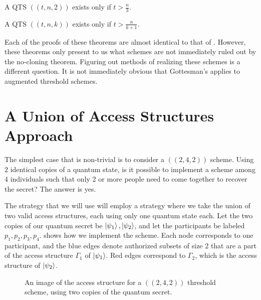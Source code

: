 \begin{theorem}
	\label{thm:qts2}
	A QTS $((t,n, 2))$ exists only if $t > \frac{n}{3}$.
\end{theorem}

\begin{theorem}
	\label{thm:qtsk}
	A QTS $((t,n, k))$ exists only if $t > \frac{n}{k+1}$.
\end{theorem}

Each of the proofs of these theorems are almost identical to that of . However, these theorems only present to us what schemes are not immediately ruled out by the no-cloning theorem. Figuring out methods of realizing these schemes is a different question. It is not immediately obvious that Gottesman's  applies to augmented threshold schemes.

\section{A Union of Access Structures Approach}

The simplest case that is non-trivial is to consider a $((2,4,2))$ scheme. Using 2 identical copies of a quantum state, is it possible to implement a scheme among 4 individuals such that only 2 or more people need to come together to recover the secret? The answer is yes.

The strategy that we will use will employ a strategy where we take the union of two valid access structures, each using only one quantum state each. Let the two copies of our quantum secret be $\ket{\psi_1}, \ket{\psi_2}$, and let the participants be labeled $p_1, p_2, p_3, p_4$.  shows how we implement the scheme. Each node corresponds to one participant, and the blue edges denote authorized subsets of size 2 that are a part of the access structure $\Gamma_1$ of $\ket{\psi_1}$. Red edges correspond to $\Gamma_2$, which is the access structure of $\ket{\psi_2}$.


\begin{figure}[ht]
	\begin{center}
	\end{center}
	\caption{An image of the access structure for a $((2,4,2))$ threshold scheme, using two copies of the quantum secret.}
	\label{fig:2-4-2}
\end{figure}


